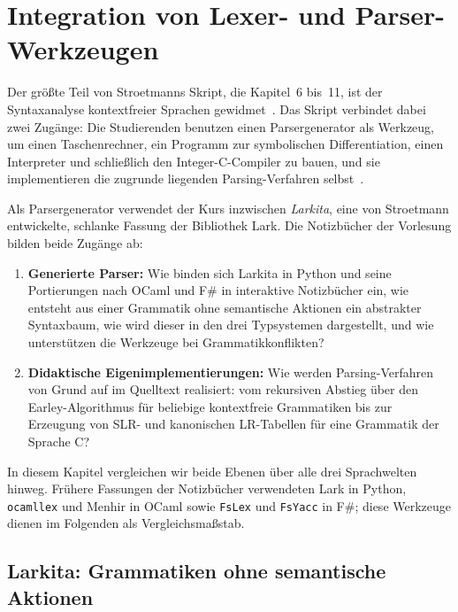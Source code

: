 \chapter{Integration von Lexer- und Parser-Werkzeugen}
\label{chap:toolchains}

Der größte Teil von Stroetmanns Skript, die Kapitel~6 bis~11, ist der Syntaxanalyse kontextfreier Sprachen gewidmet~\cite{stroetmann2026formal}.
Das Skript verbindet dabei zwei Zugänge: Die Studierenden benutzen einen Parsergenerator als Werkzeug, um einen Taschenrechner, ein Programm zur symbolischen Differentiation, einen Interpreter und schließlich den Integer-C-Compiler zu bauen, und sie implementieren die zugrunde liegenden Parsing-Verfahren selbst~\cite{earley1970efficient,knuth1965translation}.

Als Parsergenerator verwendet der Kurs inzwischen \emph{Larkita}, eine von Stroetmann entwickelte, schlanke Fassung der Bibliothek Lark.
Die Notizbücher der Vorlesung bilden beide Zugänge ab:
\begin{enumerate}
  \item \textbf{Generierte Parser:} Wie binden sich Larkita in Python und seine Portierungen nach OCaml und F\# in interaktive Notizbücher ein, wie entsteht aus einer Grammatik ohne semantische Aktionen ein abstrakter Syntaxbaum, wie wird dieser in den drei Typsystemen dargestellt, und wie unterstützen die Werkzeuge bei Grammatikkonflikten?
  \item \textbf{Didaktische Eigenimplementierungen:} Wie werden Parsing-Verfahren von Grund auf im Quelltext realisiert: vom rekursiven Abstieg über den Earley-Algorithmus für beliebige kontextfreie Grammatiken bis zur Erzeugung von SLR- und kanonischen LR-Tabellen für eine Grammatik der Sprache C?
\end{enumerate}

In diesem Kapitel vergleichen wir beide Ebenen über alle drei Sprachwelten hinweg.
Frühere Fassungen der Notizbücher verwendeten Lark in Python, \texttt{ocamllex} und Menhir in OCaml sowie \texttt{FsLex} und \texttt{FsYacc} in F\#; diese Werkzeuge dienen im Folgenden als Vergleichsmaßstab.

\section{Larkita: Grammatiken ohne semantische Aktionen}
\label{sec:larkita}

